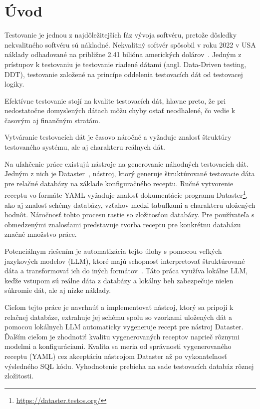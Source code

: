 \chapter{Úvod}
\label{ch:kap1}
Testovanie je jednou z najdôležitejších fáz vývoja softvéru, pretože dôsledky nekvalitného softvéru sú nákladné. Nekvalitný softvér spôsobil v roku 2022 v USA náklady odhadované na približne 2.41 bilióna amerických dolárov~\cite{Krasner2022}. Jedným z prístupov k testovaniu je testovanie riadené dátami (angl. Data-Driven testing, DDT), testovanie založené na princípe oddelenia testovacích dát od testovacej logiky.


Efektívne testovanie stojí na kvalite testovacích dát, hlavne preto, že pri nedostatočne domyslených dátach môžu chyby ostať neodhalené, čo vedie k časovým aj finančným stratám.


Vytváranie testovacích dát je časovo náročné a vyžaduje znalosť štruktúry testovaného systému, ale aj charakteru reálnych dát.


Na uľahčenie práce existujú nástroje na generovanie náhodných testovacích dát. Jedným z nich je Dataster~\cite{Vlach2020}, nástroj, ktorý generuje štruktúrované testovacie dáta pre relačné databázy na základe konfiguračného receptu. Ručné vytvorenie receptu vo formáte YAML vyžaduje znalosť dokumentácie programu Dataster\footnote{\url{https://dataster.testos.org/}}, ako aj znalosť schémy databázy, vzťahov medzi tabuľkami a charakteru uložených hodnôt. Náročnosť tohto procesu rastie so zložitosťou databázy. Pre používateľa s obmedzenými znalosťami predstavuje tvorba receptu pre konkrétnu databázu značné množstvo práce.


Potenciálnym riešením je automatizácia tejto úlohy s pomocou veľkých jazykových modelov (LLM), ktoré majú schopnosť interpretovať štruktúrované dáta a transformovať ich do iných formátov~\cite{Naveed2024}. Táto práca využíva lokálne LLM, keďže vstupom sú reálne dáta z databázy a lokálny beh zabezpečuje nielen súkromie dát, ale aj nízke náklady.


Cieľom tejto práce je navrhnúť a implementovať nástroj, ktorý sa pripojí k relačnej databáze, extrahuje jej schému spolu so vzorkami uložených dát a pomocou lokálnych LLM automaticky vygeneruje recept pre nástroj Dataster. Ďalším cieľom je zhodnotiť kvalitu vygenerovaných receptov naprieč rôznymi modelmi a konfiguráciami. Kvalita sa meria od správnosti vygenerovaného receptu (YAML) cez akceptáciu nástrojom Dataster až po vykonateľnosť výsledného SQL kódu. Vyhodnotenie prebieha na sade testovacích databáz rôznej zložitosti.



